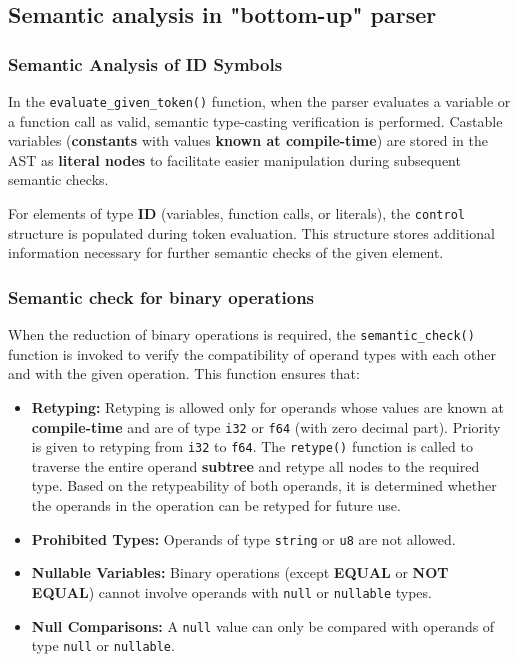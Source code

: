 \documentclass[a4paper, 11pt]{article}
\begin{document}
\subsection{Semantic analysis in "bottom-up" parser}
\subsubsection{Semantic Analysis of ID Symbols}
In the \verb|evaluate_given_token()| function, when the parser evaluates a variable or a function call as valid, semantic 
type-casting verification is performed. Castable variables (\textbf{constants} with values \textbf{known at compile-time}) 
are stored in the AST as \textbf{literal nodes} to facilitate easier manipulation during subsequent semantic checks.
\par
For elements of type \textbf{ID} (variables, function calls, or literals), the \verb|control| structure is populated during token 
evaluation. This structure stores additional information necessary for further semantic checks of the given element.

\subsubsection{Semantic check for binary operations}
When the reduction of binary operations is required, the \verb|semantic_check()| function is invoked to verify the compatibility 
of operand types with each other and with the given operation. This function ensures that:

\begin{itemize}
    \item \textbf{Retyping:} Retyping is allowed only for operands whose values are known at \textbf{compile-time} and are of type 
        \verb|i32| or \verb|f64| (with zero decimal part). Priority is given to retyping from \verb|i32| to \verb|f64|. The 
        \verb|retype()| function is called to traverse the entire operand \textbf{subtree} and retype all nodes to the required type. 
        Based on the retypeability of both operands, it is determined whether the operands in the operation can be retyped for future use.
    \item \textbf{Prohibited Types:} Operands of type \verb|string| or \verb|u8| are not allowed.
    \item \textbf{Nullable Variables:} Binary operations (except \textbf{EQUAL} or \textbf{NOT EQUAL}) cannot involve operands with 
        \verb|null| or \verb|nullable| types.
    \item \textbf{Null Comparisons:} A \verb|null| value can only be compared with operands of type \verb|null| or \verb|nullable|.
\end{itemize}
\end{document}
